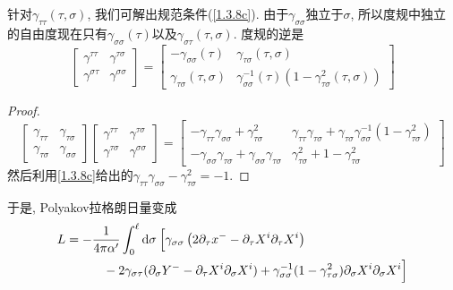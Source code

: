 针对$\gamma_{\tau\tau}(\tau,\sigma)$, 我们可解出规范条件(\ref{1.3.8c}). 由于$\gamma_{\sigma\sigma}$独立于$\sigma$, 所以度规中独立的自由度现在只有$\gamma_{\sigma\sigma}(\tau)$以及$\gamma_{\sigma\tau}(\tau,\sigma)$. 度规的逆是
\begin{equation}
\begin{bmatrix}
\gamma^{\tau \tau} & \gamma^{\tau \sigma} \\
\gamma^{\sigma \tau} & \gamma^{\sigma \sigma}
\end{bmatrix}=
\begin{bmatrix}
-\gamma_{\sigma \sigma}(\tau) & \gamma_{\tau \sigma}(\tau, \sigma) \\
\gamma_{\tau \sigma}(\tau, \sigma) & \gamma_{\sigma \sigma}^{-1}(\tau)\left(1-\gamma_{\tau \sigma}^{2}(\tau, \sigma)\right)
\end{bmatrix}
\end{equation}
\begin{proof}
    \[
\begin{bmatrix}
\gamma_{\tau \tau} & \gamma_{\tau \sigma} \\
\gamma_{\tau \sigma} & \gamma_{\sigma\sigma}
\end{bmatrix}
\begin{bmatrix}
\gamma^{\tau\tau} & \gamma^{\tau \sigma} \\
\gamma^{\tau \sigma} & \gamma^{\sigma \sigma}
\end{bmatrix}
=\begin{bmatrix}
    -\gamma_{\tau \tau} \gamma_{\sigma \sigma}+\gamma_{\tau \sigma}^{2} & \gamma_{\tau\tau} \gamma_{\tau \sigma}+\gamma_{\tau \sigma} \gamma_{\sigma \sigma}^{-1}\left(1-\gamma_{\tau \sigma}^{2}\right) \\
    -\gamma_{\sigma \sigma} \gamma_{\tau \sigma}+\gamma_{\sigma \sigma} \gamma_{\tau \sigma} & \gamma_{\tau \sigma}^{2}+1-\gamma_{\tau \sigma}^{2}  
\end{bmatrix}
\]
然后利用\eqref{1.3.8c}给出的$\gamma_{\tau\tau} \gamma_{\sigma \sigma}-\gamma_{\tau \sigma}^{2}=-1$.
\end{proof} 
\noindent 于是, Polyakov拉格朗日量变成
\begin{equation}
\begin{aligned}
L&=-\frac{1}{4 \pi \alpha^{\prime}} \int_{0}^{\ell} \mathrm{d}\sigma\: \Bigl[\gamma_{\sigma \sigma}\left(2 \partial_{\tau} x^{-}-\partial_{\tau} X^{i} \partial_{\tau} X^{i}\right) \\
&\qquad \quad-2 \gamma_{\sigma \tau}(\partial_{\sigma} Y^{-}-\partial_{\tau} X^{i} \partial_{\sigma} X^{i})
+\gamma_{\sigma \sigma}^{-1}(1-\gamma_{\tau \sigma}^{2}) \partial_{\sigma} X^{i} \partial_{\sigma} X^{i}\Bigr]
\end{aligned}
\end{equation}
